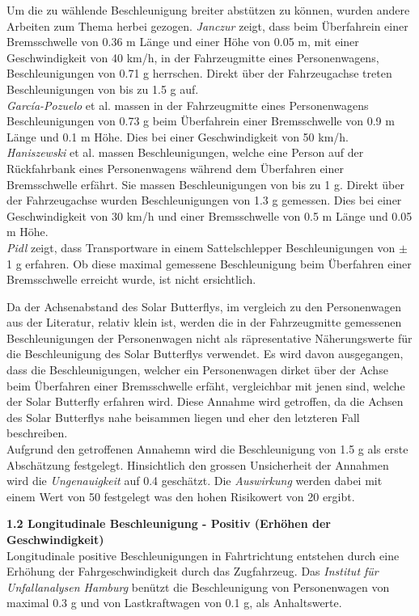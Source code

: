 \begin{description}
    Um die zu wählende Beschleunigung breiter abstützen zu können, wurden andere Arbeiten zum Thema herbei gezogen. \emph{Janczur} \cite{Beschl.1} zeigt, dass beim Überfahrein einer Bremsschwelle von 0.36 m Länge und einer Höhe von 0.05 m, mit einer Geschwindigkeit von 40 km/h, in der Fahrzeugmitte eines Personenwagens, Beschleunigungen von 0.71 g herrschen. Direkt über der Fahrzeugachse treten Beschleunigungen von bis zu 1.5 g auf.\\
    \emph{García-Pozuelo} et al. \cite{Beschl.2} massen in der Fahrzeugmitte eines Personenwagens Beschleunigungen von 0.73 g beim Überfahrein einer Bremsschwelle von 0.9 m Länge und 0.1 m Höhe. Dies bei einer Geschwindigkeit von 50 km/h.\\
    \emph{Haniszewski} et al. \cite{Beschl.3} massen Beschleunigungen, welche eine Person auf der Rückfahrbank eines Personenwagens während dem Überfahren einer Bremsschwelle erfährt. Sie massen Beschleunigungen von bis zu 1 g. Direkt über der Fahrzeugachse wurden Beschleunigungen von 1.3 g gemessen. Dies bei einer Geschwindigkeit von 30 km/h und einer Bremsschwelle von 0.5 m Länge und 0.05 m Höhe.\\
    \emph{Pidl} \cite{Beschl.4} zeigt, dass Transportware in einem Sattelschlepper Beschleunigungen von $\pm$ 1 g erfahren. Ob diese maximal gemessene Beschleunigung beim Überfahren einer Bremsschwelle erreicht wurde, ist nicht ersichtlich.

    Da der Achsenabstand des Solar Butterflys, im vergleich zu den Personenwagen aus der Literatur, relativ klein ist, werden die in der Fahrzeugmitte gemessenen Beschleunigungen der Personenwagen nicht als räpresentative Näherungswerte für die Beschleunigung des Solar Butterflys verwendet. Es wird davon ausgegangen, dass die Beschleunigungen, welcher ein Personenwagen dirket über der Achse beim Überfahren einer Bremsschwelle erfäht, vergleichbar mit jenen sind, welche der Solar Butterfly erfahren wird. Diese Annahme wird getroffen, da die Achsen des Solar Butterflys nahe beisammen liegen und eher den letzteren Fall beschreiben.\\
    Aufgrund den getroffenen Annahemn wird die Beschleunigung von 1.5 g als erste Abschätzung festgelegt. Hinsichtlich den grossen Unsicherheit der Annahmen wird die \emph{Ungenauigkeit} auf 0.4 geschätzt. Die \emph{Auswirkung} werden dabei mit einem Wert von 50 festgelegt was den hohen Risikowert von 20 ergibt.

    \item \textbf{1.2 Longitudinale Beschleunigung - Positiv (Erhöhen der Geschwindigkeit)}\\
    Longitudinale positive Beschleunigungen in Fahrtrichtung entstehen durch eine Erhöhung der Fahrgeschwindigkeit durch das Zugfahrzeug. Das \emph{Institut für Unfallanalysen Hamburg} \cite{Verz.3} benützt die Beschleunigung von Personenwagen von maximal 0.3 g und von Lastkraftwagen von 0.1 g, als Anhaltswerte.


\end{description}
